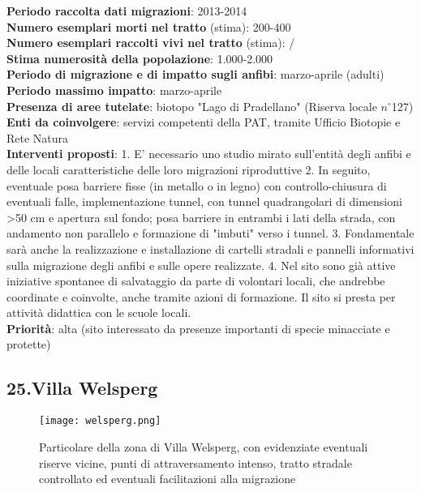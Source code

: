 \documentclass[11pt,a4paper,twoside]{memoir}
\begin{document}
\textbf{Periodo raccolta dati migrazioni}: 2013-2014 \\
\textbf{Numero esemplari morti nel tratto} (stima): 200-400 \\
\textbf{Numero esemplari raccolti vivi nel tratto} (stima): / \\
\textbf{Stima numerosità della popolazione}: 1.000-2.000 \\
\textbf{Periodo di migrazione e di impatto sugli anfibi}: marzo-aprile (adulti) \\
\textbf{Periodo massimo impatto}: marzo-aprile \\
\textbf{Presenza di aree tutelate}: biotopo "Lago di Pradellano" (Riserva locale $n^{\circ}$127) \\
\textbf{Enti da coinvolgere}: servizi competenti della PAT, tramite Ufficio Biotopie e Rete Natura \\
\textbf{Interventi proposti}: 1. E' necessario uno studio mirato sull'entità degli anfibi e delle locali caratteristiche delle loro migrazioni riproduttive 2. In seguito, eventuale posa barriere fisse (in metallo o in legno) con controllo-chiusura di eventuali falle, implementazione tunnel, con tunnel quadrangolari di dimensioni >50 cm e apertura sul fondo; posa barriere in entrambi i lati della strada, con andamento non parallelo e formazione di "imbuti" verso i tunnel. 3. Fondamentale sarà anche la realizzazione e installazione di cartelli stradali e pannelli informativi sulla migrazione degli anfibi e sulle opere realizzate. 4. Nel sito sono già attive iniziative spontanee di salvataggio da parte di volontari locali, che andrebbe coordinate e coinvolte, anche tramite azioni di formazione. Il sito si presta per attività didattica con le scuole locali. \\
\textbf{Priorità}: alta (sito interessato da presenze importanti di specie minacciate e protette) \\


\newpage
\begin{tcolorbox}[breakable,colback=white,colframe=green,width=10cm]
\subsection{25.Villa Welsperg}
\end{tcolorbox}

\begin{figure}[H]
\label{fig:map_welsperg}
\centering
  \texttt{[image: welsperg.png]}
\caption{Particolare della zona di Villa Welsperg, con evidenziate eventuali riserve vicine, punti di attraversamento intenso, tratto stradale controllato ed eventuali facilitazioni alla migrazione}
\end{figure}
\end{document}
